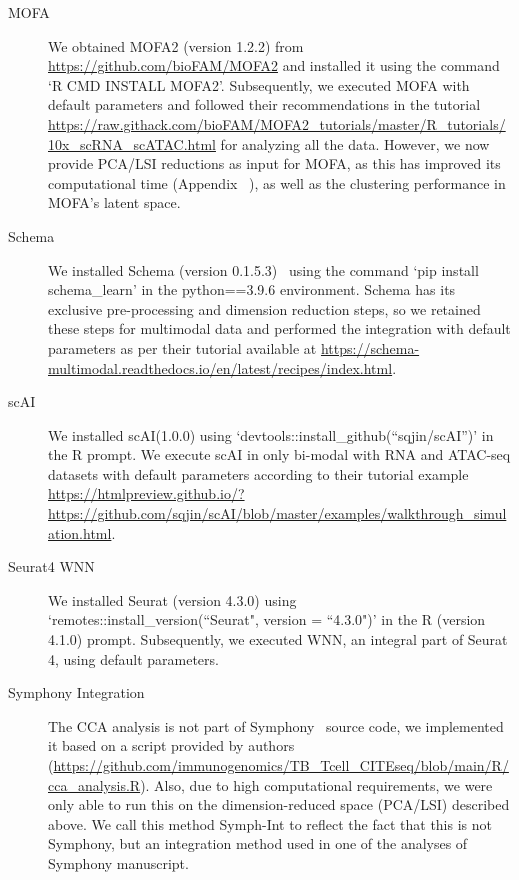 \begin{description}
    \item[MOFA] 
    We obtained MOFA2 (version 1.2.2)\citep{argelaguet2020mofa+} from \href{https://github.com/bioFAM/MOFA2}{https://github.com/bioFAM/MOFA2} and installed it using the command `R CMD INSTALL MOFA2'. Subsequently, we executed MOFA with default parameters and followed their recommendations in the tutorial \url{https://raw.githack.com/bioFAM/MOFA2_tutorials/master/R_tutorials/10x_scRNA_scATAC.html} for analyzing all the data. However, we now provide PCA/LSI reductions as input for MOFA, as this has improved its computational time (Appendix ~), as well as the clustering performance in MOFA's latent space.
    
    \item[Schema]
    We installed Schema (version 0.1.5.3)~\citep{singh2021schema} using the command `pip install schema\_learn' in the python==3.9.6 environment. Schema has its exclusive pre-processing and dimension reduction steps, so we retained these steps for multimodal data and performed the integration with default parameters as per their tutorial available at \url{https://schema-multimodal.readthedocs.io/en/latest/recipes/index.html}.
    
    \item[scAI]
    We installed scAI(1.0.0) using `devtools::install\_github(``sqjin/scAI'')' in the R prompt. We execute scAI in only bi-modal with RNA and ATAC-seq datasets with default parameters according to their tutorial example \url{https://htmlpreview.github.io/?https://github.com/sqjin/scAI/blob/master/examples/walkthrough_simulation.html}.

    \item[Seurat4 WNN]
    We installed Seurat (version 4.3.0) using `remotes::install\_version(``Seurat", version = ``4.3.0")' in the R (version 4.1.0) prompt. Subsequently, we executed WNN, an integral part of Seurat 4, using default parameters. 
    
    \item[Symphony Integration]
    The CCA analysis is not part of Symphony~\citep{kang2021symphony} source code, we implemented it based on a script provided by authors (\url{https://github.com/immunogenomics/TB_Tcell_CITEseq/blob/main/R/cca_analysis.R}). Also, due to high computational requirements, we were only able to run this on the dimension-reduced space (PCA/LSI) described above. We call this method Symph-Int to reflect the fact that this is not Symphony, but an integration method used in one of the analyses of Symphony manuscript. 
    

\end{description}


